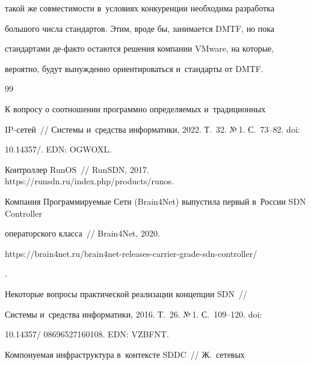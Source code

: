 такой же со\-вмес\-ти\-мости в~условиях конкуренции необходима разработка 


большого чис\-ла стандартов. Этим, вроде бы, занимается DMTF, но пока 


стандартами де-фак\-то остаются решения компании VMware, на которые, 


вероятно, будут вы\-нуж\-ден\-но ориентироваться и~стандарты от DMTF.


    


{\small\frenchspacing


{%




\begin{thebibliography}{99}




 К вопросу о соотношении программно определяемых и~традиционных  


IP-се\-тей~/\!\!/ Системы и~средства информатики, 2022. Т.~32. №\,1. С.~73--82. doi: 


10.14357\!/. EDN: OGWOXL.




Контроллер RunOS~/\!\!/ RunSDN, 2017. {\sf https://runsdn.ru/index.php/products/\linebreak runos.} 




Компания Программируемые Сети (Brain4Net) выпустила первый в~России SDN Controller 


операторского класса~/\!\!/ Brain4Net, 2020. {\sf  


https://brain4net.ru/\linebreak brain4net-releases-carrier-grade-sdn-controller/}. 







 Некоторые вопросы практической реализации концепции SDN~/\!\!/ 


Системы и~средства информатики, 2016. Т.~26. №\,1. С.~109--120. doi: 


10.14357\!/ 08696527160108. EDN: VZBFNT.







 Компонуемая инфраструктура в~контексте SDDC~/\!\!/ Ж.~сетевых 



\end{thebibliography}}}

